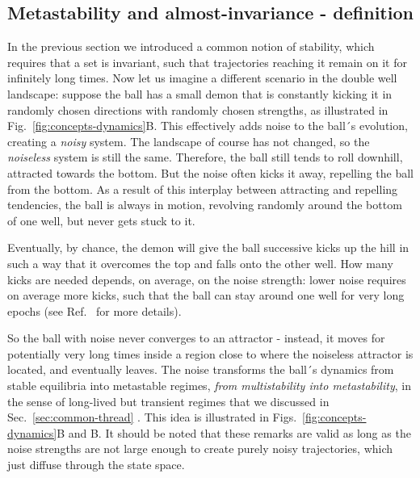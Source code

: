 \subsection{Metastability and almost-invariance - definition}\label{sec:framework}
In the previous section we introduced a common notion of stability, which requires that a set is invariant, such that trajectories reaching it remain on it for infinitely long times. Now let us imagine a different scenario in the double well landscape: suppose the ball has a small demon that is constantly kicking it in randomly chosen directions with randomly chosen strengths, as illustrated in Fig.~\ref{fig:concepts-dynamics}B. This effectively adds noise to the ball´s evolution, creating a \textit{noisy} system. The landscape of course has not changed, so the \textit{noiseless} system is still the same. Therefore, the ball still tends to roll downhill, attracted towards the bottom. But the noise often kicks it away, repelling the ball from the bottom. As a result of this interplay between attracting and repelling tendencies, the ball is always in motion, revolving randomly around the bottom of one well, but never gets stuck to it. 

Eventually, by chance, the demon will give the ball successive kicks up the hill in such a way that it overcomes the top and falls onto the other well. How many kicks are needed depends, on average, on the noise strength: lower noise requires on average more kicks, such that the ball can stay around one well for very long epochs (see Ref.~ \cite{hangi1990reaction} for more details). 

So the ball with noise never converges to an attractor - instead, it moves for potentially very long times inside a region close to where the noiseless attractor is located, and eventually leaves. The noise transforms the ball´s dynamics from stable equilibria into metastable regimes, \textit{from multistability into metastability}, in the sense of long-lived but transient regimes that we discussed in Sec.~\ref{sec:common-thread} \cite{hangi1990reaction,pisarchik2014control, arecchi1985generalized, kraut1999preference, kraut2002multistability, kraut2003enhancement, feudel2008complex}. This idea is illustrated in Figs.~\ref{fig:concepts-dynamics}B and B\supprime.  It should be noted that these remarks are valid as long as the noise strengths are not large enough to create purely noisy trajectories, which just diffuse through the state space.

